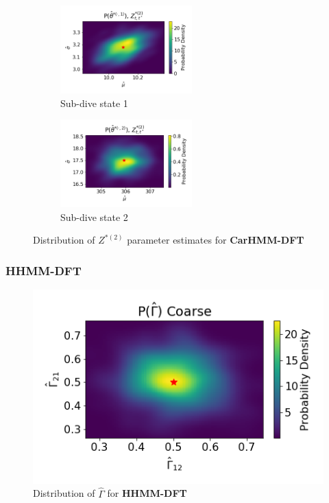\documentclass[12pt]{TD-CJS}
\begin{document}
\begin{figure}[ht]
	\centering
	\begin{subfigure}[t]{0.4\textwidth}
        \centering
        \includegraphics[width=2in]{../Plots/hmm_FV_MLE_density_FoVeDBA_0_0.png}
        \caption{Sub-dive state 1}
    \end{subfigure}
    \begin{subfigure}[t]{0.4\textwidth}
        \centering
        \includegraphics[width=2in]{../Plots/hmm_FV_MLE_density_FoVeDBA_0_1.png}
        \caption{Sub-dive state 2}
    \end{subfigure}
    \caption{Distribution of $Z^{*(2)}$ parameter estimates for \textbf{CarHMM-DFT}}
\end{figure}


\subsubsection{HHMM-DFT}

\begin{figure}
    \centering
    \includegraphics[width=5in]{../Plots/hhmm_FV_uncorr_Gamma_density_-1.png}
    \caption{Distribution of $\hat \Gamma$ for \textbf{HHMM-DFT}}
\end{figure}
\end{document}
